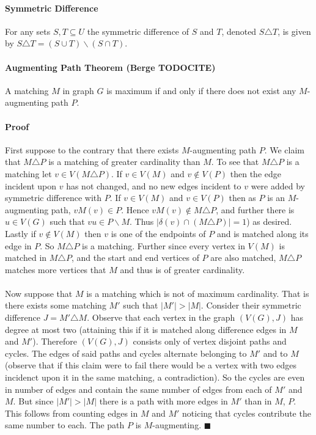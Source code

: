 \paragraph{Symmetric Difference} For any sets $S,T \subseteq U$ the symmetric difference of $S$ and $T$, denoted $S \triangle T$, is given by $S \triangle T = (S \cup T) \backslash (S \cap T)$. 
\paragraph{Augmenting Path Theorem (Berge TODOCITE)} A matching $M$ in graph $G$ is maximum if and only if there does not exist any $M$-augmenting path $P$.
\paragraph{Proof} First suppose to the contrary that there exists $M$-augmenting path $P$. We claim that $M \triangle P$ is a matching of greater cardinality than $M$. To see that $M \triangle P$ is a matching let $v \in V(M \triangle P)$. If $v \in V(M)$ and $v \not\in V(P)$ then the edge incident upon $v$ has not changed, and no new edges incident to $v$ were added by symmetric difference with $P$. If $v \in V(M)$ and $v \in V(P)$ then as $P$ is an $M$-augmenting path, $vM(v) \in P$. Hence $vM(v) \notin M \triangle P$, and further there is $u \in V(G)$ such that $vu \in P\backslash M$. Thus $|\delta(v) \cap (M\triangle P)| =1$) as desired. Lastly if $v \not\in V(M)$ then $v$ is one of the endpoints of $P$ and is matched along its edge in $P$. So $M \triangle P$ is a matching. Further since every vertex in $V(M)$ is matched in $M \triangle P$, and the start and end vertices of $P$ are also matched, $M \triangle P$ matches more vertices that $M$ and thus is of greater cardinality.
\paragraph{}
Now suppose that $M$ is a matching which is not of maximum cardinality. That is there exists some matching $M'$ such that $|M'| > |M|$. Consider their symmetric difference $J = M' \triangle M$. Observe that each vertex in the graph $(V(G), J)$ has degree at most two (attaining this if it is matched along difference edges in $M$ and $M'$). Therefore $(V(G), J)$ consists only of vertex disjoint paths and cycles. The edges of said paths and cycles alternate belonging to $M'$ and to $M$ (observe that if this claim were to fail there would be a vertex with two edges incidenct upon it in the same matching, a contradiction). So the cycles are even in number of edges and contain the same number of edges from each of $M'$ and $M$. But since $|M'| > |M|$ there is a path with more edges in $M'$ than in $M$, $P$. This follows from counting edges in $M$ and $M'$ noticing that cycles contribute the same number to each. The path $P$ is $M$-augmenting. $\blacksquare$
